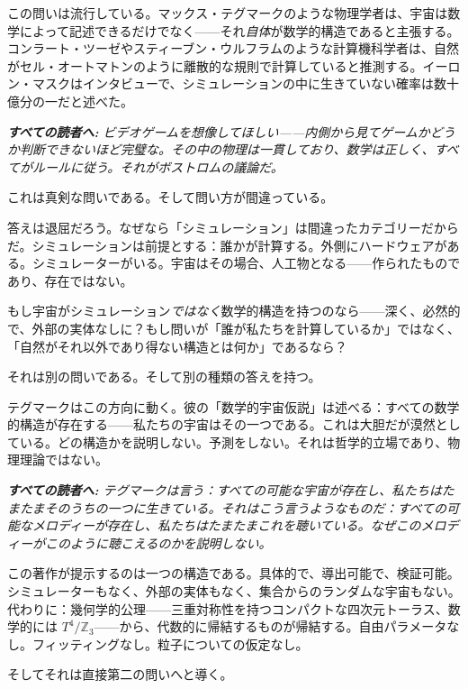 \documentclass[11pt,openany]{book}
\newenvironment{laierspur}{%
  \par\vspace{4pt}%
  \noindent\small\itshape\color{blue!60!black}%
  \textbf{すべての読者へ:}\enspace\ignorespaces}{%
  \par\vspace{4pt}\normalsize\normalfont\normalcolor}
\begin{document}
この問いは流行している。マックス・テグマークのような物理学者は、宇宙は数学によって記述できるだけでなく——それ\textit{自体}が数学的構造であると主張する。コンラート・ツーゼやスティーブン・ウルフラムのような計算機科学者は、自然がセル・オートマトンのように離散的な規則で計算していると推測する。イーロン・マスクはインタビューで、シミュレーションの中に生きていない確率は数十億分の一だと述べた。

\begin{laierspur}
ビデオゲームを想像してほしい——内側から見てゲームかどうか判断できないほど完璧な。その中の物理は一貫しており、数学は正しく、すべてがルールに従う。それがボストロムの議論だ。
\end{laierspur}

これは真剣な問いである。そして問い方が間違っている。

答えは退屈だろう。なぜなら「シミュレーション」は間違ったカテゴリーだからだ。シミュレーションは前提とする：誰かが計算する。外側にハードウェアがある。シミュレーターがいる。宇宙はその場合、人工物となる——作られたものであり、存在ではない。

もし宇宙がシミュレーション\textit{ではなく}数学的構造を持つのなら——深く、必然的で、外部の実体なしに？もし問いが「誰が私たちを計算しているか」ではなく、「自然がそれ以外であり得ない構造とは何か」であるなら？

それは別の問いである。そして別の種類の答えを持つ。

テグマークはこの方向に動く。彼の「数学的宇宙仮説」は述べる：すべての数学的構造が存在する——私たちの宇宙はその一つである。これは大胆だが漠然としている。どの構造かを説明しない。予測をしない。それは哲学的立場であり、物理理論ではない。

\begin{laierspur}
テグマークは言う：すべての可能な宇宙が存在し、私たちはたまたまそのうちの一つに生きている。それはこう言うようなものだ：すべての可能なメロディーが存在し、私たちはたまたまこれを聴いている。なぜこのメロディーがこのように聴こえるのかを説明しない。
\end{laierspur}

この著作が提示するのは一つの構造である。具体的で、導出可能で、検証可能。シミュレーターもなく、外部の実体もなく、集合からのランダムな宇宙もない。代わりに：幾何学的公理——三重対称性を持つコンパクトな四次元トーラス、数学的には $T^4/\mathbb{Z}_3$——から、代数的に帰結するものが帰結する。自由パラメータなし。フィッティングなし。粒子についての仮定なし。

そしてそれは直接第二の問いへと導く。

\medskip
\end{document}
